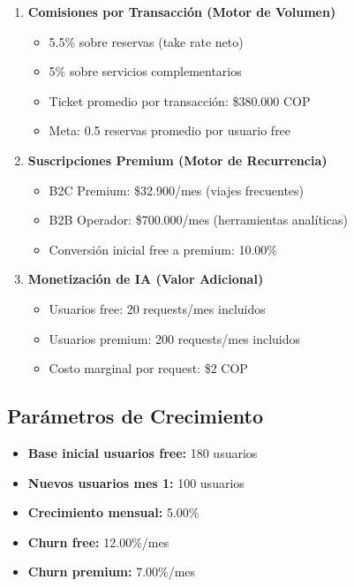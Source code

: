\documentclass[12pt]{article}
\begin{document}
\begin{enumerate}
    \item \textbf{Comisiones por Transacción (Motor de Volumen)}
    \begin{itemize}
        \item 5.5\% sobre reservas (take rate neto)
        \item 5\% sobre servicios complementarios
        \item Ticket promedio por transacción: \$380.000 COP
        \item Meta: 0.5 reservas promedio por usuario free
    \end{itemize}
    
    \item \textbf{Suscripciones Premium (Motor de Recurrencia)}
    \begin{itemize}
        \item B2C Premium: \$32.900/mes (viajes frecuentes)
        \item B2B Operador: \$700.000/mes (herramientas analíticas)
        \item Conversión inicial free a premium: 10.00\%
    \end{itemize}
    
    \item \textbf{Monetización de IA (Valor Adicional)}
    \begin{itemize}
        \item Usuarios free: 20 requests/mes incluidos
        \item Usuarios premium: 200 requests/mes incluidos
        \item Costo marginal por request: \$2 COP
    \end{itemize}
\end{enumerate}

\subsection{Parámetros de Crecimiento}

\begin{itemize}
    \item \textbf{Base inicial usuarios free:} 180 usuarios
    \item \textbf{Nuevos usuarios mes 1:} 100 usuarios
    \item \textbf{Crecimiento mensual:} 5.00\%
    \item \textbf{Churn free:} 12.00\%/mes
    \item \textbf{Churn premium:} 7.00\%/mes
\end{itemize}
\end{document}
